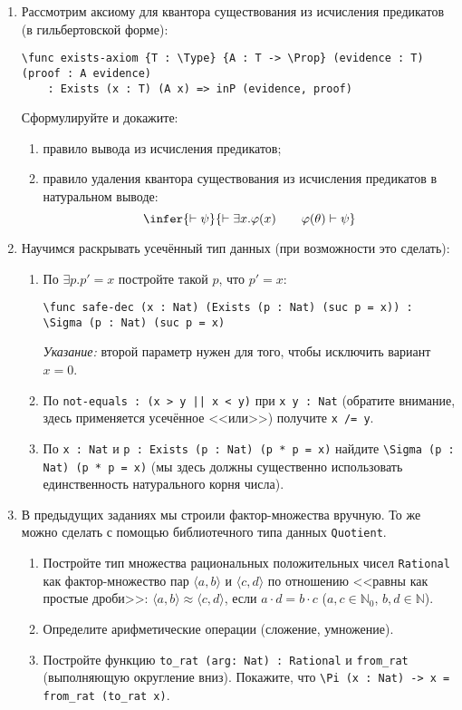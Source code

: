 \documentclass[10pt,a4paper,oneside]{article}
\begin{document}
\begin{enumerate}
\begin{enumerate}
\end{enumerate}

\item Рассмотрим аксиому для квантора существования из исчисления предикатов (в гильбертовской форме):
\begin{verbatim}
\func exists-axiom {T : \Type} {A : T -> \Prop} (evidence : T) (proof : A evidence) 
    : Exists (x : T) (A x) => inP (evidence, proof)
\end{verbatim}

Сформулируйте и докажите:
\begin{enumerate}
\item правило вывода из исчисления предикатов;
\item правило удаления квантора существования из исчисления предикатов в натуральном выводе:
$$\infer{\vdash\psi}{\vdash\exists x.\varphi(x)\quad\quad \varphi(\theta)\vdash\psi}$$
\end{enumerate}

\item Научимся раскрывать усечённый тип данных (при возможности это сделать):
\begin{enumerate}
\item По $\exists p.p' = x$ постройте такой $p$, что $p' = x$: 
\begin{verbatim}\func safe-dec (x : Nat) (Exists (p : Nat) (suc p = x)) : \Sigma (p : Nat) (suc p = x)\end{verbatim}
\emph{Указание: } второй параметр нужен для того, чтобы исключить вариант $x = 0$.
\item По \verb!not-equals : (x > y || x < y)! при \verb!x y : Nat! 
(обратите внимание, здесь применяется усечённое <<или>>) получите \verb!x /= y!.
\item По \verb!x : Nat! и \verb!p : Exists (p : Nat) (p * p = x)! найдите
\verb!\Sigma (p : Nat) (p * p = x)! (мы здесь должны существенно использовать единственность натурального корня числа).
\end{enumerate}

\item В предыдущих заданиях мы строили фактор-множества вручную. То же можно сделать с помощью библиотечного типа данных \verb!Quotient!.
\begin{enumerate}
\item Постройте тип множества рациональных положительных чисел \verb!Rational! как фактор-множество пар $\langle a,b \rangle$ и $\langle c,d \rangle$
по отношению <<равны как простые дроби>>:
$\langle a, b \rangle \approx \langle c, d \rangle$, если $a\cdot d = b \cdot c$ ($a,c \in \mathbb{N}_0$, $b,d \in \mathbb{N}$).
\item Определите арифметические операции (сложение, умножение).
\item Постройте функцию \verb!to_rat (arg: Nat) : Rational! и \verb!from_rat! (выполняющую округление вниз). Покажите, что 
\verb!\Pi (x : Nat) -> x = from_rat (to_rat x)!.
\end{enumerate}
\end{enumerate}
\end{document}
